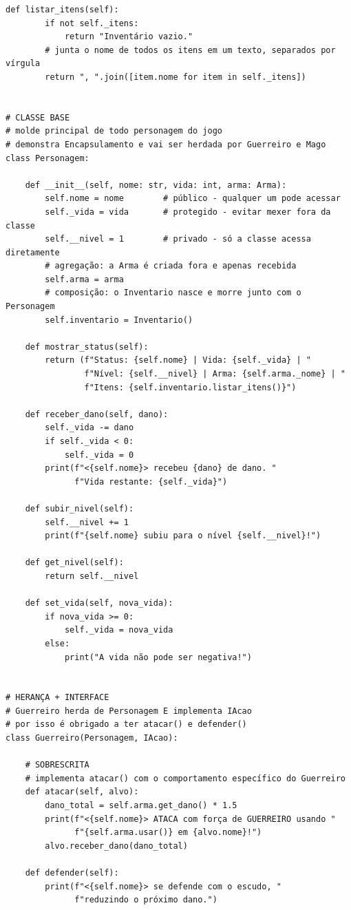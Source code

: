 \begin{lstlisting}[style=python, caption={Exemplo de Aplicação de POO em Python}]
    def listar_itens(self):
        if not self._itens:
            return "Inventário vazio."
        # junta o nome de todos os itens em um texto, separados por vírgula
        return ", ".join([item.nome for item in self._itens])


# CLASSE BASE
# molde principal de todo personagem do jogo
# demonstra Encapsulamento e vai ser herdada por Guerreiro e Mago
class Personagem:

    def __init__(self, nome: str, vida: int, arma: Arma):
        self.nome = nome        # público - qualquer um pode acessar
        self._vida = vida       # protegido - evitar mexer fora da classe
        self.__nivel = 1        # privado - só a classe acessa diretamente
        # agregação: a Arma é criada fora e apenas recebida
        self.arma = arma
        # composição: o Inventario nasce e morre junto com o Personagem
        self.inventario = Inventario()

    def mostrar_status(self):
        return (f"Status: {self.nome} | Vida: {self._vida} | "
                f"Nível: {self.__nivel} | Arma: {self.arma._nome} | "
                f"Itens: {self.inventario.listar_itens()}")

    def receber_dano(self, dano):
        self._vida -= dano
        if self._vida < 0:
            self._vida = 0
        print(f"<{self.nome}> recebeu {dano} de dano. "
              f"Vida restante: {self._vida}")

    def subir_nivel(self):
        self.__nivel += 1
        print(f"{self.nome} subiu para o nível {self.__nivel}!")

    def get_nivel(self):
        return self.__nivel

    def set_vida(self, nova_vida):
        if nova_vida >= 0:
            self._vida = nova_vida
        else:
            print("A vida não pode ser negativa!")


# HERANÇA + INTERFACE
# Guerreiro herda de Personagem E implementa IAcao
# por isso é obrigado a ter atacar() e defender()
class Guerreiro(Personagem, IAcao):

    # SOBRESCRITA
    # implementa atacar() com o comportamento específico do Guerreiro
    def atacar(self, alvo):
        dano_total = self.arma.get_dano() * 1.5
        print(f"<{self.nome}> ATACA com força de GUERREIRO usando "
              f"{self.arma.usar()} em {alvo.nome}!")
        alvo.receber_dano(dano_total)

    def defender(self):
        print(f"<{self.nome}> se defende com o escudo, "
              f"reduzindo o próximo dano.")



\end{lstlisting}
